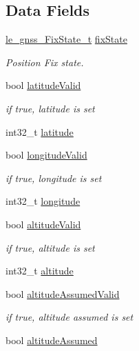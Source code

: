 \subsection*{Data Fields}
\begin{DoxyCompactItemize}
\item 
\hyperlink{le__gnss__interface_8h_abcb86aa054abc7a32d2f5a7363387ef1}{le\+\_\+gnss\+\_\+\+Fix\+State\+\_\+t} \hyperlink{structpa___gnss___position__t_a92873efa080300aa1c24c9bf14728e73}{fix\+State}
\begin{DoxyCompactList}\small\item\em Position Fix state. \end{DoxyCompactList}\item 
bool \hyperlink{structpa___gnss___position__t_a82987bddbfd0e90d1b11cdc513c170ed}{latitude\+Valid}
\begin{DoxyCompactList}\small\item\em if true, latitude is set \end{DoxyCompactList}\item 
int32\+\_\+t \hyperlink{structpa___gnss___position__t_a0544257c9cb5080b7e85cfd8547347d8}{latitude}
\item 
bool \hyperlink{structpa___gnss___position__t_a8a4538a3d728cc302f03ff4dae916f6f}{longitude\+Valid}
\begin{DoxyCompactList}\small\item\em if true, longitude is set \end{DoxyCompactList}\item 
int32\+\_\+t \hyperlink{structpa___gnss___position__t_a71da4b8299b17e53c26e4add73ac40e4}{longitude}
\item 
bool \hyperlink{structpa___gnss___position__t_ac9cc767e7159bc7eabe16787366a3f11}{altitude\+Valid}
\begin{DoxyCompactList}\small\item\em if true, altitude is set \end{DoxyCompactList}\item 
int32\+\_\+t \hyperlink{structpa___gnss___position__t_af293383355913327eaaa6d3b4ef9fb22}{altitude}
\item 
bool \hyperlink{structpa___gnss___position__t_a932196f94844d8c94c66dd8affd7c618}{altitude\+Assumed\+Valid}
\begin{DoxyCompactList}\small\item\em if true, altitude assumed is set \end{DoxyCompactList}\item 
bool \hyperlink{structpa___gnss___position__t_a76da9a49fe7f965eadb7091c69dc22ec}{altitude\+Assumed}

\end{DoxyCompactItemize}
